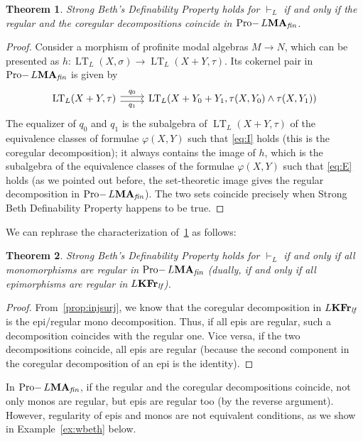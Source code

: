 \documentclass{article}
\newtheorem{thm}{Theorem}
\theoremstyle{definition}
\DeclareMathOperator{\LT}{LT}
\DeclareMathOperator{\Pro}{Pro-}
\newcommand{\KFr}{\textup{\textbf{KFr}}}
\newcommand{\MA}{\textup{\textbf{MA}}}
\newcommand{\fin}{\textit{fin}}
\newcommand{\lf}{\textit{lf}}
\begin{document}
\begin{thm}\label{thm:BethStrong}
Strong Beth's Definability Property holds for $\vdash_L$ if and only if the regular and the coregular decompositions coincide in $\Pro L\MA_\fin$.
\end{thm}
\begin{proof}
Consider a morphism of profinite modal algebras $M \longrightarrow N$, which can be presented as $h \colon \LT_L(X,\sigma) \longrightarrow \LT_L(X+Y,\tau)$. Its cokernel pair in $\Pro L\MA_\fin$ is given by
\[\begin{tikzcd}[ampersand replacement=\&]
	{\LT_L(X+Y,\tau)} \& {\LT_L(X+Y_0+Y_1, \tau(X,Y_0) \wedge \tau(X,Y_1))}
	\arrow["q_0", shift left, from=1-1, to=1-2]
	\arrow["q_1"', shift right, from=1-1, to=1-2]
\end{tikzcd}\]
The equalizer of $q_0$ and $q_1$ is the subalgebra of $\LT_L(X+Y,\tau)$ of the equivalence classes of formulae $\varphi(X,Y)$
such that \cref{eq:I} holds (this is the coregular decomposition); it always contains the image of $h$, which is the subalgebra of the equivalence classes of the formulae $\varphi(X,Y)$ such that \cref{eq:E} holds (as we pointed out before, the set-theoretic image gives the regular decomposition in $\Pro L\MA_\fin$). The two sets coincide precisely when Strong Beth Definability Property happens to be true.
\end{proof}

We can rephrase the characterization of~\cref{thm:BethStrong} as follows:
\begin{thm}\label{thm:BethStrong1}
Strong Beth's Definability Property holds for $\vdash_L$ if and only if all monomorphisms are regular in $\Pro L\MA_\fin$
(dually, if and only if all epimorphisms are regular in $L\KFr_\lf$).
\end{thm}
 \begin{proof}
    From~\cref{prop:injsurj}, we know that the coregular decomposition in $L\KFr_\lf$ is the epi/regular mono decomposition. Thus, if all epis are regular, such a decomposition coincides with the regular one. Vice versa, if the two decompositions coincide, all epis are regular (because the second component in the coregular decomposition of an epi is the identity).
 \end{proof}

In $\Pro L\MA_\fin$, if the regular and the coregular decompositions coincide, not only monos are regular, but epis are regular too (by the reverse argument). However, regularity of epis and monos are not equivalent conditions, as we show in Example~\ref{ex:wbeth} 
below.
 
\end{document}
